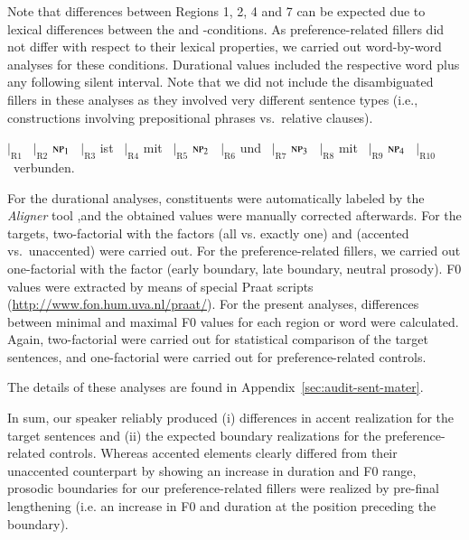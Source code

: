 \documentclass[fleqn,reqno,10pt,draft]{article}
\newcommand{\as}{\acro{as}}
\renewcommand{\es}{\acro{es}}
\begin{document}
Note that differences between Regions 1, 2, 4 and 7 can be expected
due to lexical differences between the \as and \es-conditions. As
preference-related fillers did not differ with respect to their lexical
properties, we carried out word-by-word analyses for these
conditions. Durational values included the respective word plus any
following silent interval. Note that we did not include the
disambiguated fillers in these analyses as they involved very
different sentence types (i.e., constructions involving prepositional
phrases vs.~relative clauses).

\begin{exe}
  \ex $|_{\text{R}1}$   	\ $|_{\text{R}2}$ $\textsc{np}_1$
      \ $|_{\text{R}3}$ ist 
      \ $|_{\text{R}4}$ mit  \ $|_{\text{R}5}$ $\textsc{np}_2$   \
      $|_{\text{R}6}$ und  \ $|_{\text{R}7}$ $\textsc{np}_3$ 
       \ $|_{\text{R}8}$  mit  \ $|_{\text{R}9}$ $\textsc{np}_4$ \ $|_{\text{R}10}$~verbunden.
\end{exe}

For the durational analyses, constituents were automatically labeled
by the \emph{Aligner} tool \citet{Rapp98},and the
obtained values were manually corrected afterwards. For the targets,
two-factorial \acros{anova} with the factors \acro{Quantifier} (all
vs. exactly one) and \acro{Prosody} (accented vs.~unaccented) were
carried out. For the preference-related fillers, we carried out
one-factorial  with the factor  (early
boundary, late boundary, neutral prosody). F0 values were extracted by
means of special Praat scripts
(\url{http://www.fon.hum.uva.nl/praat/}). For the present analyses,
differences between minimal and maximal F0 values for each region or
word were calculated. Again, two-factorial  were carried
out for statistical comparison of the target sentences, and one-factorial
\acros{anova} were carried out for preference-related controls.

The details of these analyses are found in
Appendix~\ref{sec:audit-sent-mater}.  

In sum, our speaker reliably
produced (i) differences in accent realization for the target
sentences and (ii) the expected boundary realizations for the
preference-related controls. Whereas accented elements clearly
differed from their unaccented counterpart by showing an increase in
duration and F0 range, prosodic boundaries for our preference-related
fillers were realized by pre-final lengthening (i.e. an increase in F0
and duration at the position preceding the boundary).
\end{document}
